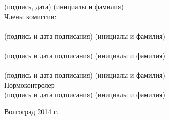 \begin{titlepage}
\begin{flushleft}
            \vspace{-0.2cm}\hspace{8cm}\footnotesize(подпись, дата)
            \hspace{3cm}(инициалы и фамилия)\normalsize\\
            \vspace{1cm}
        Члены комиссии:\\
        \hspace{0.2cm}\underline{\hspace{5cm}}\hspace{0.5cm}\underline{\hspace{6cm}}\\
            \vspace{-0.2cm}\hspace{0.5cm}\footnotesize(подпись и дата подписания)\hspace{2cm}
            (инициалы и фамилия)\\
        \hspace{0.2cm}\underline{\hspace{5cm}}\hspace{0.5cm}\underline{\hspace{6cm}}\\
            \vspace{-0.2cm}\hspace{0.5cm}\footnotesize(подпись и дата подписания)\hspace{2cm}
            (инициалы и фамилия)\\
        \hspace{0.2cm}\underline{\hspace{5cm}}\hspace{0.5cm}\underline{\hspace{6cm}}\\
            \vspace{-0.2cm}\hspace{0.5cm}\footnotesize(подпись и дата подписания)\hspace{2cm}
            (инициалы и фамилия)\\
        \vspace{2cm}\normalsize
        Нормоконтролер \underline{\hspace{5cm}}\hspace{0.5cm}\underline{\hspace{7cm}}\\[-.2cm]
            \vspace{-0.2cm}\hspace{4.2cm}\footnotesize(подпись и дата подписания)\hspace{2.5cm}
        (инициалы и фамилия)\normalsize\\
    \end{flushleft}
    \vspace{\fill}
    \begin{center}
        Волгоград 2014 г.
    \end{center}
\end{titlepage}
